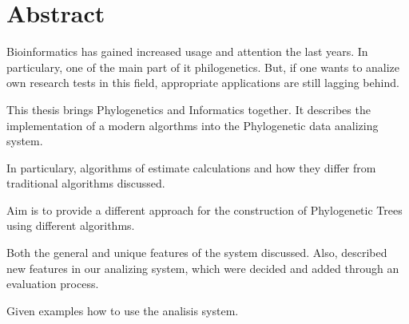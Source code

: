 \chapter*{Abstract} 
Bioinformatics has gained increased usage and attention the last years.
In particulary, one of the main part of it philogenetics. 
But, if one wants to analize own research tests in this field, appropriate applications 
are still lagging behind.

This thesis brings Phylogenetics and Informatics together. 
It describes the implementation of a modern algorthms
into the Phylogenetic data analizing system. 

In particulary, algorithms of estimate calculations \cite{kamilov} and how they
differ from traditional algorithms discussed.

Aim is to provide a different approach for the 
construction of Phylogenetic Trees using different algorithms.\cite{juravlyov}

Both the general and unique features of the system discussed. Also, 
described new features in our analizing system, which were decided 
and added through an evaluation process.

Given examples how to use the analisis system.\par

\vspace{10mm}


